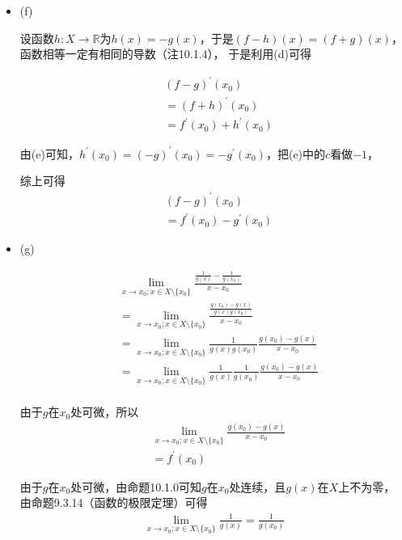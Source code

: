 \documentclass{article}
\begin{document}
\begin{itemize}
  \item (f)

        设函数$h : X \to \mathbb{R}$为$h(x) = -g(x)$，于是$(f-h)(x) = (f+g)(x)$，函数相等一定有相同的导数（注10.1.4），
        于是利用(d)可得

        \begin{align*}
           & (f-g)^\prime(x_0)               \\
           & = (f+h)^\prime(x_0)             \\
           & = f^\prime(x_0) + h^\prime(x_0)
        \end{align*}

        由(e)可知，$h^\prime(x_0) = (-g)^\prime(x_0) = -g^\prime(x_0)$，把(e)中的$c$看做$-1$，

        综上可得
        \begin{align*}
           & (f-g)^\prime(x_0)               \\
           & = f^\prime(x_0) - g^\prime(x_0)
        \end{align*}


  \item (g)

        \begin{align*}
           & \lim\limits_{x \to x_0; x \in X \setminus \{x_0\}} \frac{\frac{1}{g(x)} - \frac{1}{g(x_0)}}{x - x_0}               \\
           & = \lim\limits_{x \to x_0; x \in X \setminus \{x_0\}} \frac{\frac{g(x_0) - g(x)}{g(x)g(x_0)}}{x - x_0}              \\
           & = \lim\limits_{x \to x_0; x \in X \setminus \{x_0\}} \frac{1}{g(x)g(x_0)} \frac{g(x_0) - g(x)}{x - x_0}            \\
           & = \lim\limits_{x \to x_0; x \in X \setminus \{x_0\}} \frac{1}{g(x)} \frac{1}{g(x_0)} \frac{g(x_0) - g(x)}{x - x_0} \\
        \end{align*}

        由于$g$在$x_0$处可微，所以
        \begin{align*}
           & \lim\limits_{x \to x_0; x \in X \setminus \{x_0\}} \frac{g(x_0) - g(x)}{x - x_0} \\
           & = f^\prime(x_0)
        \end{align*}

        由于$g$在$x_0$处可微，由命题10.1.0可知$g$在$x_0$处连续，且$g(x)$在$X$上不为零，
        由命题9.3.14（函数的极限定理）可得
        \begin{align*}
          \lim\limits_{x \to x_0; x \in X \setminus \{x_0\}} \frac{1}{g(x)} = \frac{1}{g(x_0)}
        \end{align*}



\end{itemize}
\end{document}
